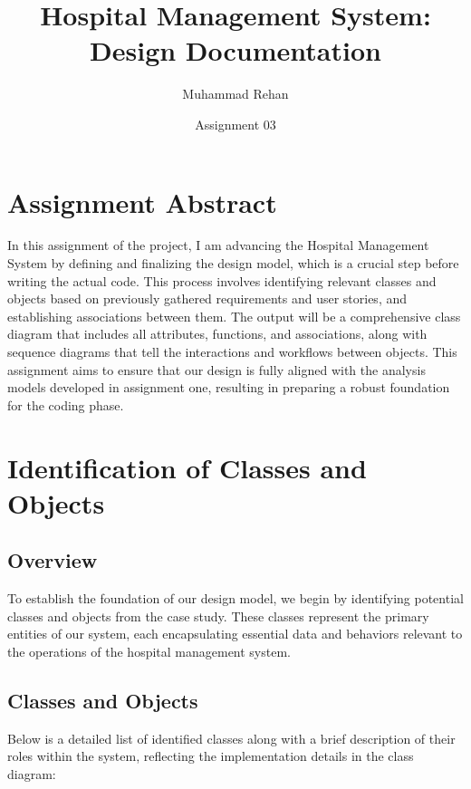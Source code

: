 \documentclass[12pt]{article}
\title{Hospital Management System: Design Documentation}
\author{Muhammad Rehan}
\date{Assignment 03}
\begin{document}
\maketitle

\section*{Assignment Abstract}
In this assignment of the project, I am advancing the Hospital Management System by defining and finalizing the design model, which is a crucial step before writing the actual code. This process involves identifying relevant classes and objects based on previously gathered requirements and user stories, and establishing associations between them. The output will be a comprehensive class diagram that includes all attributes, functions, and associations, along with sequence diagrams that tell the interactions and workflows between objects. This assignment aims to ensure that our design is fully aligned with the analysis models developed in assignment one, resulting in preparing a robust foundation for the coding phase.

\section*{Identification of Classes and Objects}
\subsection*{Overview}
To establish the foundation of our design model, we begin by identifying potential classes and objects from the case study. These classes represent the primary entities of our system, each encapsulating essential data and behaviors relevant to the operations of the hospital management system.

\subsection*{Classes and Objects}
Below is a detailed list of identified classes along with a brief description of their roles within the system, reflecting the implementation details in the class diagram:
\end{document}
